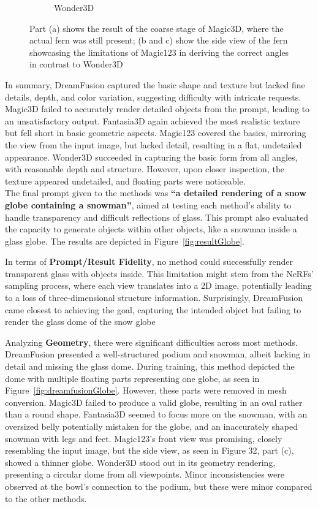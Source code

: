 \begin{figure}[ht]
\begin{subfigure}[b]{0.32\textwidth}
        \caption{Wonder3D}
    \end{subfigure}
    \caption{Part (a) shows the result of the coarse stage of Magic3D, where the actual fern was still present; (b and c) show the side view of the fern showcasing the limitations of Magic123 in deriving the correct angles in contrast to Wonder3D}\label{fig:fernSideview}
  \end{figure}

In summary, DreamFusion captured the basic shape and texture but lacked fine details, depth, and color variation, suggesting difficulty with intricate requests. Magic3D failed to accurately render detailed objects from the prompt, leading to an unsatisfactory output. Fantasia3D again achieved the most realistic texture but fell short in basic geometric aspects. Magic123 covered the basics, mirroring the view from the input image, but lacked detail, resulting in a flat, undetailed appearance. Wonder3D succeeded in capturing the basic form from all angles, with reasonable depth and structure. However, upon closer inspection, the texture appeared undetailed, and floating parts were noticeable.\\



The final prompt given to the methods was \textbf{``a detailed rendering of a snow globe containing a snowman''}, aimed at testing each method's ability to handle transparency and difficult reflections of glass. This prompt also evaluated the capacity to generate objects within other objects, like a snowman inside a glass globe. The results are depicted in Figure~\ref{fig:resultGlobe}.

In terms of \textbf{Prompt/Result Fidelity}, no method could successfully render transparent glass with objects inside. This limitation might stem from the NeRFs' sampling process, where each view translates into a 2D image, potentially leading to a loss of three-dimensional structure information. Surprisingly, DreamFusion came closest to achieving the goal, capturing the intended object but failing to render the glass dome of the snow globe

Analyzing \textbf{Geometry}, there were significant difficulties across most methods.  DreamFusion presented a well-structured podium and snowman, albeit lacking in detail and missing the glass dome. During training, this method depicted the dome with multiple floating parts representing one globe, as seen in Figure~\ref{fig:dreamfusionGlobe}. However, these parts were removed in mesh conversion. Magic3D failed to produce a valid globe, resulting in an oval rather than a round shape. Fantasia3D seemed to focus more on the snowman, with an oversized belly potentially mistaken for the globe, and an inaccurately shaped snowman with legs and feet. Magic123's front view was promising, closely resembling the input image, but the side view, as seen in Figure 32, part (c), showed a thinner globe. Wonder3D stood out in its geometry rendering, presenting a circular dome from all viewpoints. Minor inconsistencies were observed at the bowl's connection to the podium, but these were minor compared to the other methods.

